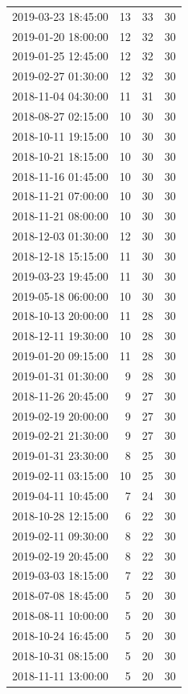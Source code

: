 \begin{tabular}{lrrr}
2019-03-23 18:45:00 & 13 & 33 & 30 \\
2019-01-20 18:00:00 & 12 & 32 & 30 \\
2019-01-25 12:45:00 & 12 & 32 & 30 \\
2019-02-27 01:30:00 & 12 & 32 & 30 \\
2018-11-04 04:30:00 & 11 & 31 & 30 \\
2018-08-27 02:15:00 & 10 & 30 & 30 \\
2018-10-11 19:15:00 & 10 & 30 & 30 \\
2018-10-21 18:15:00 & 10 & 30 & 30 \\
2018-11-16 01:45:00 & 10 & 30 & 30 \\
2018-11-21 07:00:00 & 10 & 30 & 30 \\
2018-11-21 08:00:00 & 10 & 30 & 30 \\
2018-12-03 01:30:00 & 12 & 30 & 30 \\
2018-12-18 15:15:00 & 11 & 30 & 30 \\
2019-03-23 19:45:00 & 11 & 30 & 30 \\
2019-05-18 06:00:00 & 10 & 30 & 30 \\
2018-10-13 20:00:00 & 11 & 28 & 30 \\
2018-12-11 19:30:00 & 10 & 28 & 30 \\
2019-01-20 09:15:00 & 11 & 28 & 30 \\
2019-01-31 01:30:00 & 9 & 28 & 30 \\
2018-11-26 20:45:00 & 9 & 27 & 30 \\
2019-02-19 20:00:00 & 9 & 27 & 30 \\
2019-02-21 21:30:00 & 9 & 27 & 30 \\
2019-01-31 23:30:00 & 8 & 25 & 30 \\
2019-02-11 03:15:00 & 10 & 25 & 30 \\
2019-04-11 10:45:00 & 7 & 24 & 30 \\
2018-10-28 12:15:00 & 6 & 22 & 30 \\
2019-02-11 09:30:00 & 8 & 22 & 30 \\
2019-02-19 20:45:00 & 8 & 22 & 30 \\
2019-03-03 18:15:00 & 7 & 22 & 30 \\
2018-07-08 18:45:00 & 5 & 20 & 30 \\
2018-08-11 10:00:00 & 5 & 20 & 30 \\
2018-10-24 16:45:00 & 5 & 20 & 30 \\
2018-10-31 08:15:00 & 5 & 20 & 30 \\
2018-11-11 13:00:00 & 5 & 20 & 30 \\

\end{tabular}
